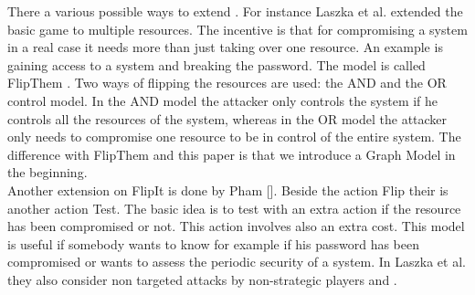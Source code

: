 There a various possible ways to extend . For instance Laszka et al. extended the basic  game to multiple resources. The incentive is that for compromising a system in a real case it needs more than just taking over one resource. An example is gaining access to a system and breaking the password. The model is called FlipThem \cite{FlipThem}. Two ways of flipping the resources are used: the AND and the OR control model. In the AND model the attacker only controls the system if he controls all the resources of the system, whereas in the OR model the attacker only needs to compromise one resource to be in control of the entire system. The difference with FlipThem and this paper is that we introduce a Graph Model in the beginning.\\
Another extension on FlipIt is done by Pham\cite{GameTheorApprCostBenefitAnalyses} []. Beside the action Flip their is another action Test. The basic idea is to test with an extra action if the resource has been compromised or not. This action involves also an extra cost. This model is useful if somebody wants to know for example if his password has been compromised or wants to assess the periodic security of a system.  In \cite{MitigationCovert} \cite{MitigationNonTargeted} Laszka et al. they also consider non targeted attacks by non-strategic players and . \\

